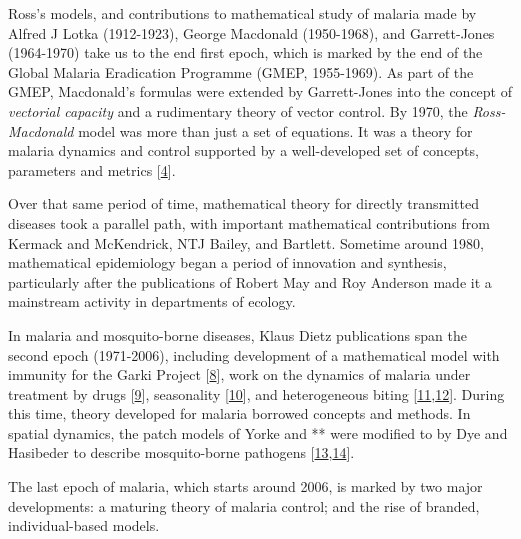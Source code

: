\documentclass[
]{book}
\begin{document}
Ross's models, and contributions to mathematical study of malaria made by Alfred J Lotka (1912-1923), George Macdonald (1950-1968), and Garrett-Jones (1964-1970) take us to the end first epoch, which is marked by the end of the Global Malaria Eradication Programme (GMEP, 1955-1969). As part of the GMEP, Macdonald's formulas were extended by Garrett-Jones into the concept of \emph{vectorial capacity} and a rudimentary theory of vector control. By 1970, the \emph{Ross-Macdonald} model was more than just a set of equations. It was a theory for malaria dynamics and control supported by a well-developed set of concepts, parameters and metrics {[}\protect\hyperlink{ref-SmithDL2012_RossMacdonald}{4}{]}.

Over that same period of time, mathematical theory for directly transmitted diseases took a parallel path, with important mathematical contributions from Kermack and McKendrick, NTJ Bailey, and Bartlett. Sometime around 1980, mathematical epidemiology began a period of innovation and synthesis, particularly after the publications of Robert May and Roy Anderson made it a mainstream activity in departments of ecology.

In malaria and mosquito-borne diseases, Klaus Dietz publications span the second epoch (1971-2006), including development of a mathematical model with immunity for the Garki Project {[}\protect\hyperlink{ref-DietzK1974MalariaModel}{8}{]}, work on the dynamics of malaria under treatment by drugs {[}\protect\hyperlink{ref-DietzK1975ModelsParasitic}{9}{]}, seasonality {[}\protect\hyperlink{ref-DietzK1976IncidenceInfectious}{10}{]}, and heterogeneous biting {[}\protect\hyperlink{ref-DietzK1980ModelsVectorborne}{11},\protect\hyperlink{ref-DietzK1988EpidemiologicalModels}{12}{]}. During this time, theory developed for malaria borrowed concepts and methods. In spatial dynamics, the patch models of Yorke and ** were modified to by Dye and Hasibeder to describe mosquito-borne pathogens {[}\protect\hyperlink{ref-DyeC1986PopulationDynamics}{13},\protect\hyperlink{ref-HasibederG1988PopulationDynamics}{14}{]}.

The last epoch of malaria, which starts around 2006, is marked by two major developments: a maturing theory of malaria control; and the rise of branded, individual-based models.
\end{document}

